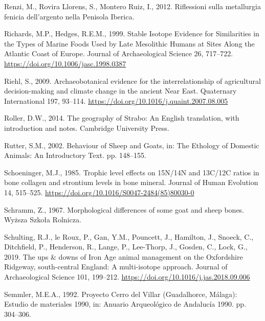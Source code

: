 \documentclass[preprint, 3p, authoryear]{elsarticle} %
\newlength{\cslhangindent}
\newlength{\cslentryspacingunit} %
\newenvironment{CSLReferences}[2] %
 {%
  \setlength{\parindent}{0pt}
  \ifodd #1
  \let\oldpar\par
  \def\par{\hangindent=\cslhangindent\oldpar}
  \fi
  \setlength{\parskip}{#2\cslentryspacingunit}
 }%
 {}
\begin{document}
\begin{CSLReferences}{1}{0}
\leavevmode{}%
Renzi, M., Rovira Llorens, S., Montero Ruiz, I., 2012. Riflessioni sulla metallurgia fenicia dell'argento nella {Penisola Iberica}.

\leavevmode{}%
Richards, M.P., Hedges, R.E.M., 1999. Stable {Isotope Evidence} for {Similarities} in the {Types} of {Marine Foods Used} by {Late Mesolithic Humans} at {Sites Along} the {Atlantic Coast} of {Europe}. Journal of Archaeological Science 26, 717--722. \url{https://doi.org/10.1006/jasc.1998.0387}

\leavevmode{}%
Riehl, S., 2009. Archaeobotanical evidence for the interrelationship of agricultural decision-making and climate change in the ancient {Near East}. Quaternary International 197, 93--114. \url{https://doi.org/10.1016/j.quaint.2007.08.005}

\leavevmode{}%
Roller, D.W., 2014. The geography of {Strabo}: {An English} translation, with introduction and notes. {Cambridge University Press}.

\leavevmode{}%
Rutter, S.M., 2002. Behaviour of {Sheep} and {Goats}, in: The Ethology of Domestic Animals: {An} Introductory Text. pp. 148--155.

\leavevmode{}%
Schoeninger, M.J., 1985. Trophic level effects on {15N}/{14N} and {13C}/{12C} ratios in bone collagen and strontium levels in bone mineral. Journal of Human Evolution 14, 515--525. \url{https://doi.org/10.1016/S0047-2484(85)80030-0}

\leavevmode{}%
Schramm, Z., 1967. Morphological differences of some goat and sheep bones. {Wyższa Szkoła Rolnicza}.

\leavevmode{}%
Schulting, R.J., le Roux, P., Gan, Y.M., Pouncett, J., Hamilton, J., Snoeck, C., Ditchfield, P., Henderson, R., Lange, P., Lee-Thorp, J., Gosden, C., Lock, G., 2019. The ups \& downs of {Iron Age} animal management on the {Oxfordshire Ridgeway}, south-central {England}: A multi-isotope approach. Journal of Archaeological Science 101, 199--212. \url{https://doi.org/10.1016/j.jas.2018.09.006}

\leavevmode{}%
Semmler, M.E.A., 1992. Proyecto {Cerro} del {Villar} ({Guadalhorce}, {Málaga}): Estudio de materiales 1990, in: Anuario Arqueológico de {Andalucía} 1990. pp. 304--306.


\end{CSLReferences}
\end{document}
